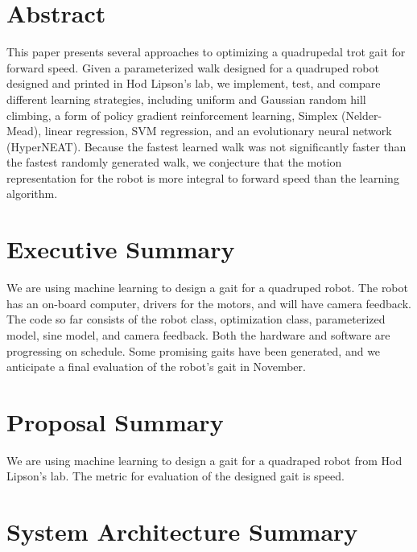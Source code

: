 \section{Abstract}
This paper presents several approaches to optimizing a quadrupedal
trot gait for forward speed. Given a parameterized walk designed for
a quadruped robot designed and printed in Hod Lipson's lab, 
we implement, test, and compare different learning strategies, 
including uniform and Gaussian random hill climbing, a form of policy 
gradient reinforcement learning\cite{1}, Simplex (Nelder-Mead), 
linear regression, SVM regression, and an evolutionary neural 
network (HyperNEAT)\cite{2}. Because the fastest learned walk was not
significantly faster than the fastest randomly generated walk, we
conjecture that the motion representation for the robot is more
integral to forward speed than the learning algorithm.

\section{Executive Summary}
We are using machine learning to design a gait for a quadruped
robot. The robot has an on-board computer, drivers for the motors, and
will have camera feedback. The code so far consists of the robot
class, optimization class, parameterized model, sine model, and camera
feedback.  Both the hardware and software are progressing on schedule.
Some promising gaits have been generated, and we anticipate a final
evaluation of the robot’s gait in November.

\section{Proposal Summary}

We are using machine learning to design a gait for a quadraped robot
from Hod Lipson’s lab. The metric for evaluation of the designed gait
is speed.


\section{System Architecture Summary}

